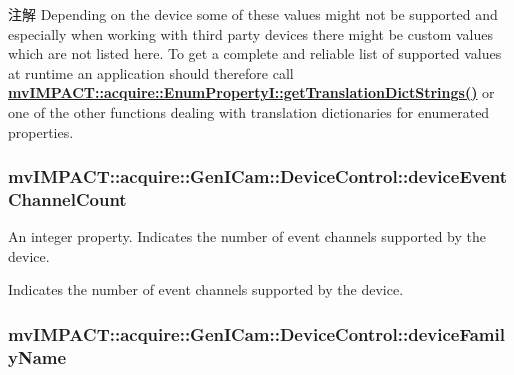 \begin{DoxyNote}{注解}
Depending on the device some of these values might not be supported and especially when working with third party devices there might be custom values which are not listed here. To get a complete and reliable list of supported values at runtime an application should therefore call {\bfseries \hyperlink{classmv_i_m_p_a_c_t_1_1acquire_1_1_enum_property_i_a0ba6ccbf5ee69784d5d0b537924d26b6}{mv\+I\+M\+P\+A\+C\+T\+::acquire\+::\+Enum\+Property\+I\+::get\+Translation\+Dict\+Strings()}} or one of the other functions dealing with translation dictionaries for enumerated properties. 
\end{DoxyNote}
\hypertarget{classmv_i_m_p_a_c_t_1_1acquire_1_1_gen_i_cam_1_1_device_control_aa5fcd8c9da11cc57e21379adec8f3b4e}{
\subsubsection[{device\+Event\+Channel\+Count}]{ mv\+I\+M\+P\+A\+C\+T\+::acquire\+::\+Gen\+I\+Cam\+::\+Device\+Control\+::device\+Event\+Channel\+Count}}\label{classmv_i_m_p_a_c_t_1_1acquire_1_1_gen_i_cam_1_1_device_control_aa5fcd8c9da11cc57e21379adec8f3b4e}


An integer property. Indicates the number of event channels supported by the device. 

Indicates the number of event channels supported by the device. \hypertarget{classmv_i_m_p_a_c_t_1_1acquire_1_1_gen_i_cam_1_1_device_control_a90c0fed8938bd8a829d44b3edf559ad3}{
\subsubsection[{device\+Family\+Name}]{ mv\+I\+M\+P\+A\+C\+T\+::acquire\+::\+Gen\+I\+Cam\+::\+Device\+Control\+::device\+Family\+Name}}\label{classmv_i_m_p_a_c_t_1_1acquire_1_1_gen_i_cam_1_1_device_control_a90c0fed8938bd8a829d44b3edf559ad3}



